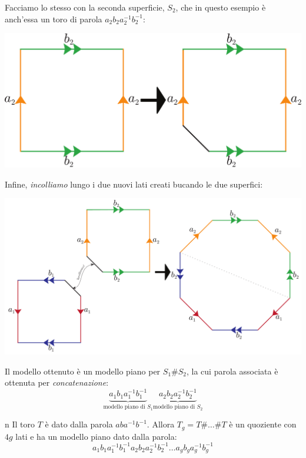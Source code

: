 Facciamo lo stesso con la seconda superficie, $S_2$, che in questo esempio è anch'essa un toro di parola $a_2b_2a_2^{-1}b_2^{-1}$:
\begin{center}
	\includegraphics[trim=0cm 0cm 0cm 0cm, clip, scale=0.35]{images/torusmodelconnect3.pdf}
\end{center}
Infine, \textit{incolliamo} lungo i due nuovi lati creati bucando le due superfici:
 \begin{center}
 	\includegraphics[trim=0cm 0cm 0cm 0cm, clip, scale=0.35]{images/torusmodelconnect4.pdf}
 \end{center}
Il modello ottenuto è un modello piano per $S_1\# S_2$, la cui parola associata è ottenuta per \textit{concatenazione}:
\begin{equation*}
	\underbrace{a_1b_1a_1^{-1}b_1^{-1}}_{\text{modello piano di }S_1}\underbrace{a_2b_2a_2^{-1}b_2^{-1}}_{\text{modello piano di }S_2}
\end{equation*}
\begin{example}{n}
Il toro $T$ è dato dalla parola $aba^{-1}b^{-1}$. Allora $T_g=T\#\ldots\# T$ è un quoziente con $4g$ lati e ha un modello piano dato dalla parola:
\begin{equation*}
a_1b_1a_1^{-1}b_1^{-1}a_2b_2a_2^{-1}b_2^{-1}\ldots a_gb_ga_g^{-1}b_g^{-1}
\end{equation*}
\end{example}
